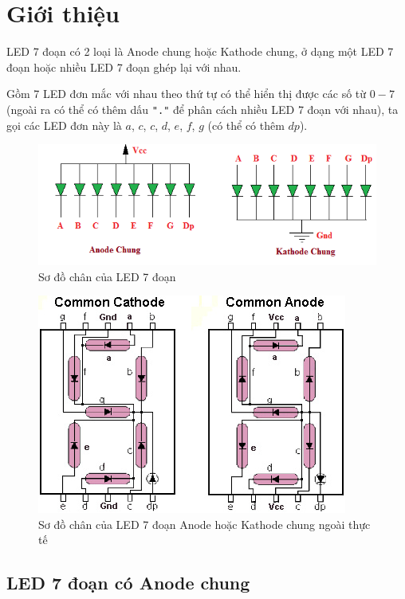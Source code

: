 \tocless \section{Giới thiệu}
LED 7 đoạn có 2 loại là Anode chung hoặc Kathode chung, ở dạng một LED 7 đoạn hoặc nhiều LED 7 đoạn ghép lại với nhau.

Gồm 7 LED đơn mắc với nhau theo thứ tự có thể hiển thị được các số từ $0 - 7$ (ngoài ra có thể có thêm dấu \verb|"."| để phân cách nhiều LED 7 đoạn với nhau), ta gọi các LED đơn này là $a$, $c$, $c$, $d$, $e$, $f$, $g$ (có thể có thêm $dp$).
\begin{figure}[!h]
\begin{center}
\includegraphics[scale=.6]{phu-luc/image/led-7-seg}
\end{center}
\caption{Sơ đồ chân của LED 7 đoạn}
\end{figure}
\begin{figure}[!h]
\begin{center}
\includegraphics[scale=.4]{phu-luc/image/led-7-seg-anode-kathode}
\end{center}
\caption{Sơ đồ chân của LED 7 đoạn Anode hoặc Kathode chung ngoài thực tế}
\end{figure}
\tocless \subsection{LED 7 đoạn có Anode chung}
